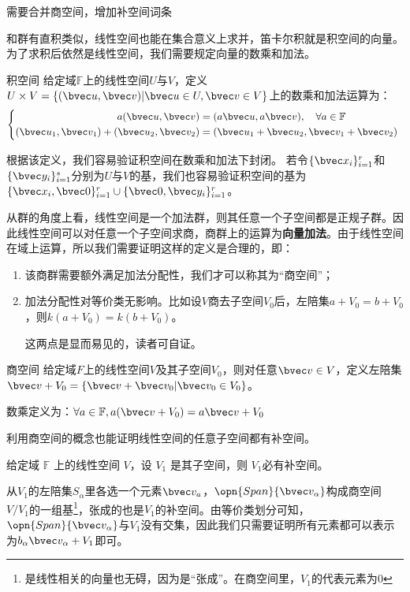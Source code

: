 

\begin{issues}
\issueTODO 需要合并商空间，增加补空间词条
\end{issues}


和群有直积类似，线性空间也能在集合意义上求并，笛卡尔积就是积空间的向量。为了求积后依然是线性空间，我们需要规定向量的数乘和加法。

\begin{definition}{积空间}
给定域$\mathbb F $上的线性空间$U$与$V$，定义$U\times V=\{(\bvec u,\bvec v)|\bvec u\in U,\bvec v\in V\}$上的数乘和加法运算为：
\begin{equation}
\left\{\begin{aligned}
a(\bvec u,\bvec v)&=(a\bvec u,a\bvec v),\quad \forall a\in \mathbb F\\
(\bvec u_1,\bvec v_1)+(\bvec u_2,\bvec v_2)&=(\bvec u_1+\bvec u_2,\bvec v_1+\bvec v_2)
\end{aligned}\right.~
\end{equation}
\end{definition}
根据该定义，我们容易验证积空间在数乘和加法下封闭。
若令$\{\bvec x_i\}^r_{i=1}$和$\{\bvec y_i\}^s_{i=1}$分别为$U$与$V$的基，我们也容易验证积空间的基为$\{\bvec x_i,\bvec 0\}^r_{i=1}\cup \{\bvec 0,\bvec y_i\}^r_{i=1}$。

从群的角度上看，线性空间是一个加法群，则其任意一个子空间都是正规子群。因此线性空间可以对任意一个子空间求商，商群上的运算为\textbf{向量加法}。由于线性空间在域上运算，所以我们需要证明这样的定义是合理的，即：
\begin{enumerate}
\item 该商群需要额外满足加法分配性，我们才可以称其为“商空间”；
\item 加法分配性对等价类无影响。比如设$V$商去子空间$V_0$后，左陪集$a+V_0=b+V_0$，则$k(a+V_0)=k(b+V_0)$。

这两点是显而易见的，读者可自证。
\end{enumerate}
\begin{definition}{商空间}
给定域$F$上的线性空间$V$及其子空间$V_0$，则对任意$\bvec v\in V$，定义左陪集$\bvec v+V_0=\{\bvec v+\bvec v_0|\bvec v_0\in V_0\}$。

数乘定义为：$\forall a\in \mathbb F,a(\bvec v+V_0)=a\bvec v+V_0$
\end{definition}


利用商空间的概念也能证明线性空间的任意子空间都有补空间。
\begin{theorem}{}
给定域 $\mathbb F$ 上的线性空间 $V$，设 $V_1$ 是其子空间，则 $V_1$必有补空间。
\end{theorem}
从$V_1$的左陪集${S_{\alpha}}$里各选一个元素$\bvec v_a$，$\opn{Span} \{\bvec v_{\alpha}\}$构成商空间$V/V_1$的一组基\footnote{是线性相关的向量也无碍，因为是“张成”。在商空间里，$V_1$的代表元素为$0$}，张成的也是$V_1$的补空间。由等价类划分可知，$\opn{Span} \{\bvec v_{\alpha}\}$与$V_1$没有交集，因此我们只需要证明所有元素都可以表示为$b_{\alpha}\bvec v_{\alpha}+V_1$即可。

